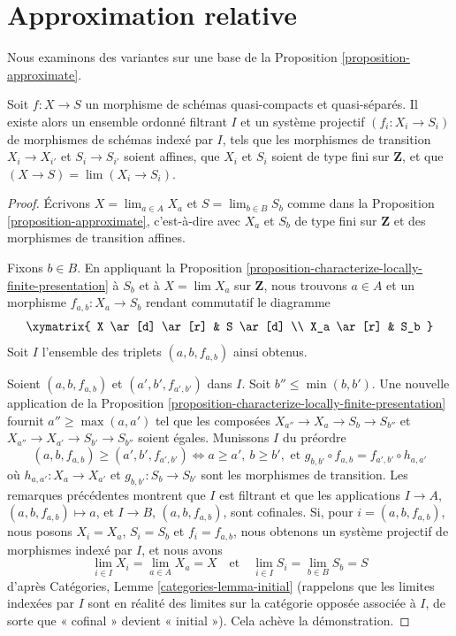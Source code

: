 \section{Approximation relative}
\label{section-relative-approximation}

\noindent
Nous examinons des variantes sur une base de la
Proposition \ref{proposition-approximate}.

\begin{lemma}
\label{lemma-approximate-morphism}
Soit $f : X \to S$ un morphisme de schémas quasi-compacts et quasi-séparés.
Il existe alors un ensemble ordonné filtrant $I$ et un système projectif
$(f_i : X_i \to S_i)$ de morphismes de schémas indexé par $I$, tels que les
morphismes de transition $X_i \to X_{i'}$ et $S_i \to S_{i'}$ soient
affines, que $X_i$ et $S_i$ soient de type fini sur $\mathbf{Z}$, et que
$(X \to S) = \lim (X_i \to S_i)$.
\end{lemma}

\begin{proof}
Écrivons $X = \lim_{a \in A} X_a$ et $S = \lim_{b \in B} S_b$ comme dans la
Proposition \ref{proposition-approximate}, c'est-à-dire avec $X_a$ et $S_b$
de type fini sur $\mathbf{Z}$ et des morphismes de transition affines.

\medskip\noindent
Fixons $b \in B$. En appliquant la
Proposition \ref{proposition-characterize-locally-finite-presentation} à
$S_b$ et à $X = \lim X_a$ sur $\mathbf{Z}$, nous trouvons $a \in A$ et un
morphisme $f_{a, b} : X_a \to S_b$ rendant commutatif le diagramme
$$
\xymatrix{
X \ar[d] \ar[r] & S \ar[d] \\
X_a \ar[r] & S_b
}
$$
Soit $I$ l'ensemble des triplets $(a, b, f_{a, b})$ ainsi obtenus.

\medskip\noindent
Soient $(a, b, f_{a, b})$ et $(a', b', f_{a', b'})$ dans $I$. Soit
$b'' \leq \min(b, b')$. Une nouvelle application de la
Proposition \ref{proposition-characterize-locally-finite-presentation}
fournit $a'' \geq \max(a, a')$ tel que les composées
$X_{a''} \to X_a \to S_b \to S_{b''}$ et
$X_{a''} \to X_{a'} \to S_{b'} \to S_{b''}$ soient égales. Munissons $I$
du préordre
$$
(a, b, f_{a, b}) \geq (a', b', f_{a', b'})
\Leftrightarrow
a \geq a',\ b \geq b',\text{ et }
g_{b, b'} \circ f_{a, b} = f_{a', b'} \circ h_{a, a'}
$$
où $h_{a, a'} : X_a \to X_{a'}$ et $g_{b, b'} : S_b \to S_{b'}$ sont les
morphismes de transition. Les remarques précédentes montrent que $I$ est
filtrant et que les applications $I \to A$,
$(a, b, f_{a, b}) \mapsto a$, et $I \to B$, $(a, b, f_{a, b})$, sont
cofinales. Si, pour $i = (a, b, f_{a, b})$, nous posons $X_i = X_a$,
$S_i = S_b$ et $f_i = f_{a, b}$, nous obtenons un système projectif de
morphismes indexé par $I$, et nous avons
$$
\lim_{i \in I} X_i = \lim_{a \in A} X_a = X
\quad\text{et}\quad
\lim_{i \in I} S_i = \lim_{b \in B} S_b = S
$$
d'après Catégories, Lemme \ref{categories-lemma-initial} (rappelons que les
limites indexées par $I$ sont en réalité des limites sur la catégorie opposée
associée à $I$, de sorte que « cofinal » devient « initial »). Cela achève la
démonstration.
\end{proof}

